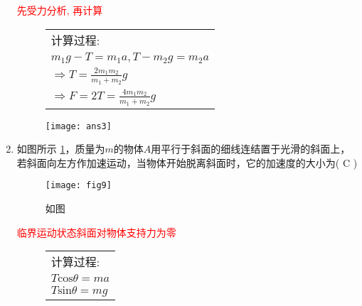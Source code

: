 \begin{enumerate}
\begin{note}
    \textcolor{red}{先受力分析, 再计算}
    \begin{figure}[ht]
        \begin{minipage}[ht]{0.6\linewidth}
            \begin{table}[H]
                \begin{tabular}{l}
                   \qquad 计算过程:\\
                   \qquad \qquad $m_1g-T=m_1a, T-m_2g = m_2a$ \\
                    \qquad \qquad   $\Longrightarrow T = \frac{2m_1m_2}{m_1+m_2}g$ \\
                    \qquad \qquad $\Longrightarrow F = 2T =\frac{4m_1m_2}{m_1+m_2}g$\\ 
                \end{tabular}
            \end{table}  
        \end{minipage}
        \begin{minipage}[h]{0.3\linewidth}
            \texttt{[image: ans3]}
        \end{minipage}
    \end{figure}
\end{note}
\item 如图所示 \ref{Fig:9}，质量为$m$的物体$A$用平行于斜面的细线连结置于光滑的斜面上，若斜面向左方作加速运动，当物体开始脱离斜面时，它的加速度的大小为( C )
    \begin{figure}[H]
        \centering
        \texttt{[image: fig9]}
        \caption{如图}\label{Fig:9}
    \end{figure}
    \begin{note}
        \textcolor{red}{临界运动状态斜面对物体支持力为零}
        \begin{figure}[ht]
            \begin{minipage}[ht]{0.6\linewidth}
                \begin{table}[H]
                    \begin{tabular}{l}
                       \qquad 计算过程:\\
                       \qquad \qquad $T \mathrm{cos}\theta=ma$ \\
                       \qquad \qquad $T \mathrm{sin}\theta=mg$ \\
                    \end{tabular}

\end{table}
\end{minipage}
\end{figure}
\end{note}
\end{enumerate}
